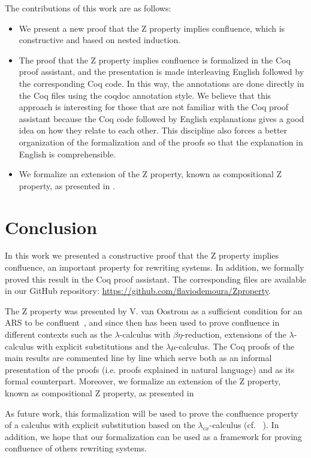 \documentclass{entcs}
\begin{document}
The contributions of this work are as follows:
\begin{itemize}
\item We present a new proof that the Z property implies confluence,
  which is constructive and based on nested induction.
\item The proof that the Z property implies confluence is formalized
  in the Coq proof assistant, and the presentation is made
  interleaving English followed by the corresponding Coq code. In this
  way, the annotations are done directly in the Coq files using the
  coqdoc annotation style. We believe that this approach is
  interesting for those that are not familiar with the Coq proof
  assistant because the Coq code followed by English explanations
  gives a good idea on how they relate to each other. This discipline
  also forces a better organization of the formalization and of the
  proofs so that the explanation in English is comprehensible.
\item We formalize an extension of the Z property, known as
  compositional Z property, as presented in
  \cite{Nakazawa-Fujita2016}.
\end{itemize}




\section{Conclusion}

In this work we presented a constructive proof that the Z property
implies confluence, an important property for rewriting systems. In
addition, we formally proved this result in the Coq proof
assistant. The corresponding files are available in our GitHub
repository: \url{https://github.com/flaviodemoura/Zproperty}.

The Z property was presented by V. van Oostrom as a sufficient
condition for an ARS to be confluent~\cite{ZPropertyDraft}, and since
then has been used to prove confluence in different contexts such as
the $\lambda$-calculus with $\beta\eta$-reduction, extensions of the
$\lambda$-calculus with explicit substitutions and the
$\lambda\mu$-calculus. The Coq proofs of the main results are
commented line by line which serve both as an informal presentation of
the proofs (i.e. proofs explained in natural language) and as its
formal counterpart. Moreover, we formalize an extension of the Z
property, known as compositional Z property, as presented in
\cite{Nakazawa-Fujita2016}

As future work, this formalization will be used to prove the
confluence property of a calculus with explicit substitution based on
the $\lambda_{ex}$-calculus (cf. ~\cite{kes09}). In addition, we hope
that our formalization can be used as a framework for proving
confluence of others rewriting systems.



\end{document}

